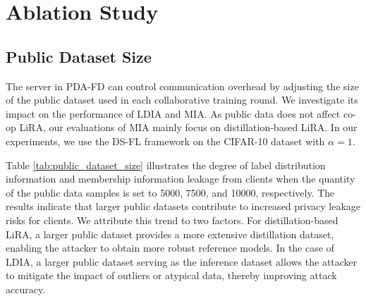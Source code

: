 \section{Ablation Study}
\label{sec:ablation}
\subsection{Public Dataset Size}
The server in PDA-FD can control communication overhead by adjusting the size of the public dataset used in each collaborative training round.
We investigate its impact on the performance of LDIA and MIA. 
As public data does not affect co-op LiRA, our evaluations of MIA mainly focus on distillation-based LiRA. 
In our experiments, we use the DS-FL framework on the CIFAR-10 dataset with $\alpha=1$.
\begin{table}[h]
    \caption{Impact of Public Data Quantity on Label Distribution and Membership Information Leakage in PDA-FD.}
    \centering
    \scriptsize
    \label{tab:public_dataset_size}
\end{table}
Table \ref{tab:public_dataset_size} illustrates the degree of label distribution information and membership information leakage from clients when the quantity of the public data samples is set to 5000, 7500, and 10000, respectively.
The results indicate that larger public datasets contribute to increased privacy leakage risks for clients. 
We attribute this trend to two factors. For distillation-based LiRA, a larger public dataset provides a more extensive distillation dataset, enabling the attacker to obtain more robust reference models.
In the case of LDIA, a larger public dataset serving as the inference dataset allows the attacker to mitigate the impact of outliers or atypical data, thereby improving attack accuracy.


